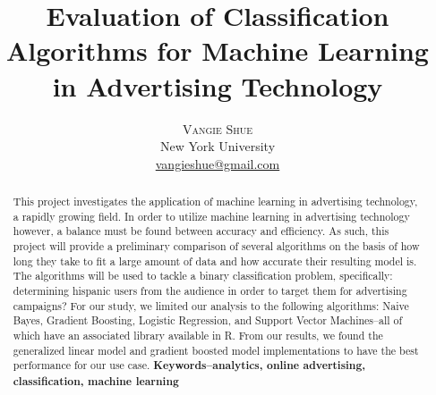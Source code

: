 \documentclass[twoside]{article}
\title{\vspace{-15mm}\fontsize{24pt}{10pt}\selectfont\textbf{Evaluation of Classification Algorithms for Machine Learning in Advertising Technology}} %
\author{
\large
\textsc{Vangie Shue}\\[2mm] %
\normalsize New York University \\ %
\normalsize \href{mailto:vangieshue@gmail.com}{vangieshue@gmail.com} %
\vspace{-5mm}
}
\date{}
\begin{document}
\maketitle %

\thispagestyle{fancy} %


\begin{abstract}

\noindent
This project investigates the application of machine learning in advertising technology, a rapidly growing field. In order to utilize machine learning in advertising technology however, a balance must be found between accuracy and efficiency. As such, this project will provide a preliminary comparison of several algorithms on the basis of how long they take to fit a large amount of data and how accurate their resulting model is. The algorithms will be used to tackle a binary classification problem, specifically: determining hispanic users from the audience in order to target them for advertising campaigns? For our study, we limited our analysis to the following algorithms: Naive Bayes, Gradient Boosting, Logistic Regression, and Support Vector Machines--all of which have an associated library available in R. From our results, we found the generalized linear model and gradient boosted model implementations to have the best performance for our use case. 
\textbf{Keywords--analytics, online advertising, classification, machine learning}

\end{abstract}

\end{document}
